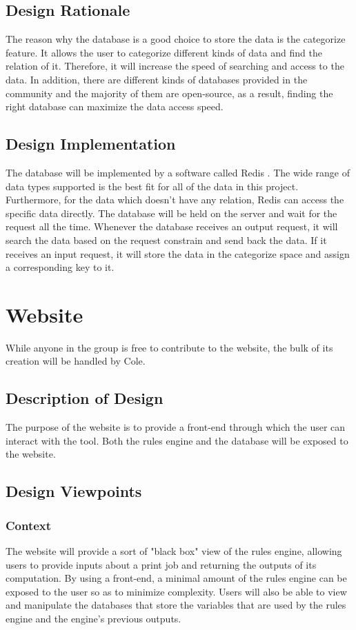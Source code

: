 \documentclass[draftclsnofoot,onecolumn,10pt,compsoc]{IEEEtran}
\begin{document}
\subsection{Design Rationale}
The reason why the database is a good choice to store the data is the categorize feature. It allows the user to categorize different kinds of data and find the relation of it. Therefore, it will increase the speed of searching and access to the data. In addition, there are different kinds of databases provided in the community and the majority of them are open-source, as a result, finding the right database can maximize the data access speed.

\subsection{Design Implementation}
The database will be implemented by a software called Redis \cite{redis}. The wide range of data types supported is the best fit for all of the data in this project. Furthermore, for the data which doesn't have any relation, Redis can access the specific data directly. The database will be held on the server and wait for the request all the time. Whenever the database receives an output request, it will search the data based on the request constrain and send back the data. If it receives an input request, it will store the data in the categorize space and assign a corresponding key to it.


\pagebreak %
\section{Website}
While anyone in the group is free to contribute to the website, the bulk of its creation will be handled by Cole.

\subsection{Description of Design}
The purpose of the website is to provide a front-end through which the user can interact with the tool. Both the rules engine and the database will be exposed to the website.

\subsection{Design Viewpoints}
\subsubsection{Context}
The website will provide a sort of "black box" view of the rules engine, allowing users to provide inputs about a print job and returning the outputs of its computation. By using a front-end, a minimal amount of the rules engine can be exposed to the user so as to minimize complexity. Users will also be able to view and manipulate the databases that store the variables that are used by the rules engine and the engine's previous outputs.
\end{document}
